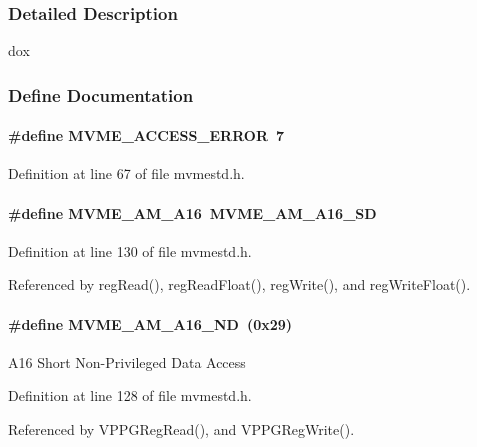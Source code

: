 \subsubsection{Detailed Description}
dox 

\subsubsection{Define Documentation}
\paragraph[{MVME\_\-ACCESS\_\-ERROR}]{\setlength{\rightskip}{0pt plus 5cm}\#define MVME\_\-ACCESS\_\-ERROR~7}\hfill\label{group__mvmestdinclude_ga727cbc169f0f84cbe9fe93051a74491f}


Definition at line 67 of file mvmestd.h.
\paragraph[{MVME\_\-AM\_\-A16}]{\setlength{\rightskip}{0pt plus 5cm}\#define MVME\_\-AM\_\-A16~MVME\_\-AM\_\-A16\_\-SD}\hfill\label{group__mvmestdinclude_gacff1e71dbcb7a864f560fe5b0458512c}


Definition at line 130 of file mvmestd.h.

Referenced by regRead(), regReadFloat(), regWrite(), and regWriteFloat().
\paragraph[{MVME\_\-AM\_\-A16\_\-ND}]{\setlength{\rightskip}{0pt plus 5cm}\#define MVME\_\-AM\_\-A16\_\-ND~(0x29)}\hfill\label{group__mvmestdinclude_gaac7d8e02b3139be0c6943e1d2f0a8361}
A16 Short Non-\/Privileged Data Access 

Definition at line 128 of file mvmestd.h.

Referenced by VPPGRegRead(), and VPPGRegWrite().
